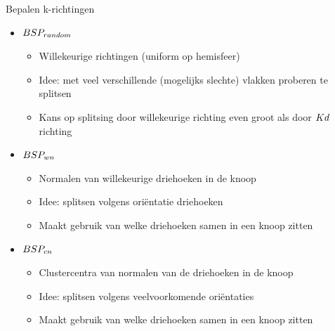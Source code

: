 \documentclass[11pt,t]{beamer}
\begin{document}
\begin{frame}{Bepalen k-richtingen}
	\begin{itemize}
		\item $BSP_{random}$
		\begin{itemize}
			\item Willekeurige richtingen (uniform op hemisfeer)
			\item Idee: met veel verschillende (mogelijks slechte) vlakken proberen te splitsen
			\item Kans op splitsing door willekeurige richting even groot als door $Kd$ richting
		\end{itemize}
		\item $BSP_{wn}$
		\begin{itemize}
			\item Normalen van willekeurige driehoeken in de knoop
			\item Idee: splitsen volgens oriëntatie driehoeken 
			\item Maakt gebruik van welke driehoeken samen in een knoop zitten
		\end{itemize}
		\item $BSP_{cn}$
		\begin{itemize}
			\item Clustercentra van normalen van de driehoeken in de knoop
			\item Idee: splitsen volgens veelvoorkomende oriëntaties 
			\item Maakt gebruik van welke driehoeken samen in een knoop zitten
		\end{itemize}
	\end{itemize}
\end{frame}
\end{document}
